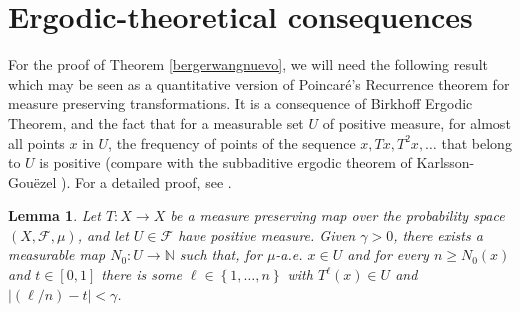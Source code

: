 \documentclass[JEP,XML,SOM,Unicode,NoEqCountersInSection]{cedram}
\let\mathcal\mathscr
\theoremstyle{plain}
\newtheorem{lema}[teo]{Lemma}
\theoremstyle{definition}
\newcommand{\NN}{\mathbb{N}}
\newcommand{\corchete}[1]{\left\{{#1}\right\}}
\begin{document}
\section{Ergodic-theoretical consequences}\label{seccioncinco}
For the proof of Theorem \ref{bergerwangnuevo}, we will need the following result which may be seen as a quantitative version of Poincaré's Recurrence theorem for measure preserving transformations. It is a consequence of Birkhoff Ergodic Theorem, and the fact that for a measurable set $U$ of positive measure, for almost all points $x$ in $U$, the frequency of points of the sequence $x,Tx,T^{2}x,\dots$ that belong to $U$ is positive (compare with the subbaditive ergodic theorem of Karlsson-Gouëzel \cite[Th.\,1.1]{goukar}). For a detailed proof, see \cite[Lem.\,3.12]{bochilya}.
\begin{lema}\label{superpoincare}
Let $T:X\rightarrow X$ be a measure preserving map over the probability space $(X,\mathcal{F},\mu)$, and let $U\in \mathcal{F}$ have positive measure. Given $\gamma>0$, there exists a measurable map $N_0:U\rightarrow \NN$ such that, for $\mu$-a.e. $x\in U$ and for every $n\geq N_{0}(x)$ and $t\in [0,1]$ there is some $\ell \in \corchete{1,\dots,n}$ with $T^{\ell}(x)\in U$ and $|(\ell/n)-t|<\gamma$.
\end{lema}
\end{document}
